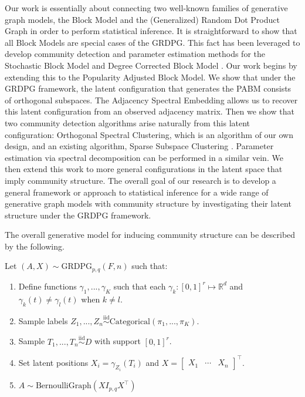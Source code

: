 \documentclass[
  11pt,
]{article}
\providecommand{\tightlist}{%
  \setlength{\itemsep}{0pt}\setlength{\parskip}{0pt}}
\begin{document}
Our work is essentially about connecting two well-known families of
generative graph models, the Block Model and the (Generalized) Random
Dot Product Graph \cite{rubindelanchy2017statistical} in order to
perform statistical inference. It is straightforward to show that all
Block Models are special cases of the GRDPG. This fact has been
leveraged to develop community detection and parameter estimation
methods
\cite{athreya2017statistical, lyzinski2014, rubindelanchy2017statistical}
for the Stochastic Block Model \cite{doi:10.1080/0022250X.1971.9989788}
and Degree Corrected Block Model \cite{Karrer_2011}. Our work begins by
extending this to the Popularity Adjusted Block Model. We show that
under the GRDPG framework, the latent configuration that generates the
PABM consists of orthogonal subspaces. The Adjacency Spectral Embedding
allows us to recover this latent configuration from an observed
adjacency matrix. Then we show that two community detection algorithms
arise naturally from this latent configuration: Orthogonal Spectral
Clustering, which is an algorithm of our own design, and an existing
algorithm, Sparse Subspace Clustering \cite{5206547}. Parameter
estimation via spectral decomposition can be performed in a similar
vein. We then extend this work to more general configurations in the
latent space that imply community structure. The overall goal of our
research is to develop a general framework or approach to statistical
inference for a wide range of generative graph models with community
structure by investigating their latent structure under the GRDPG
framework.

The overall generative model for inducing community structure can be
described by the following.

Let \((A, X) \sim \text{GRDPG}_{p, q}(F, n)\) such that:

\begin{enumerate}
\def\labelenumi{\arabic{enumi}.}
\tightlist
\item
  Define functions \(\gamma_1, ..., \gamma_K\) such that each
  \(\gamma_k : [0, 1]^r \mapsto \mathbb{R}^d\) and
  \(\gamma_k(t) \neq \gamma_l(t)\) when \(k \neq l\).
\item
  Sample labels
  \(Z_1, ..., Z_n \stackrel{\text{iid}}{\sim}\text{Categorical}(\pi_1, ..., \pi_K)\).
\item
  Sample \(T_1, ..., T_n \stackrel{\text{iid}}{\sim}D\) with support
  \([0, 1]^r\).
\item
  Set latent positions \(X_i = \gamma_{Z_i}(T_i)\) and
  \(X = \begin{bmatrix} X_1 & \cdots & X_n \end{bmatrix}^\top\).
\item
  \(A \sim \text{BernoulliGraph}(X I_{p, q} X^\top)\)
\end{enumerate}
\end{document}
